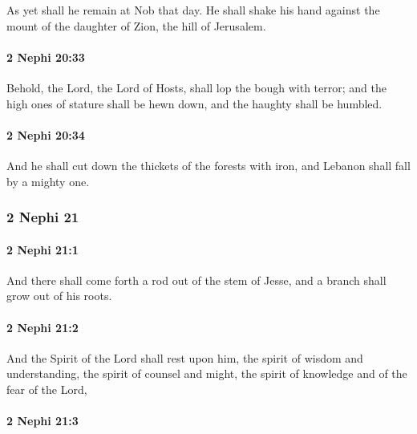 			As yet shall he remain at Nob that day.
			He shall shake his hand against the mount of the daughter of Zion,
			the hill of Jerusalem.

		\paragraph{2 Nephi 20:33} %
			\label{2NEPHI-20-33}

			Behold, the Lord, the Lord of Hosts, shall lop the bough with terror;
			and the high ones of stature shall be hewn down,
			and the haughty shall be humbled.

		\paragraph{2 Nephi 20:34} %
			\label{2NEPHI-20-34}

			And he shall cut down the thickets of the forests with iron,
			and Lebanon shall fall by a mighty one.

	\subsubsection{2 Nephi 21} %
		\label{2NEPHI-21}
		
		\paragraph{2 Nephi 21:1} %
			\label{2NEPHI-21-1}

			And there shall come forth a rod out of the stem of Jesse,
			and a branch shall grow out of his roots.

		\paragraph{2 Nephi 21:2} %
			\label{2NEPHI-21-2}

			And the Spirit of the Lord shall rest upon him,
			the spirit of wisdom and understanding,
			the spirit of counsel and might,
			the spirit of knowledge and of the fear of the Lord,

		\paragraph{2 Nephi 21:3} %
			\label{2NEPHI-21-3}

